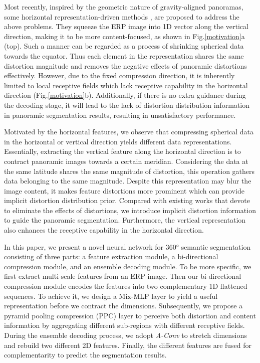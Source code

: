 \documentclass[runningheads]{llncs}
\begin{document}
	
	Most recently, inspired by the geometric nature of gravity-aligned panoramas, some horizontal representation-driven methods \cite{pintore2021slicenet}, \cite{sun2021hohonet} are proposed to address the above problems.
They squeeze the ERP image into 1D vector along the vertical direction, making it to be more content-focused, as shown in Fig.\ref{motivation}a (top).
Such a manner can be regarded as a process of shrinking spherical data towards the equator.
	Thus each element in the representation shares the same distortion magnitude and removes the negative effects of panoramic distortions effectively.
However, due to the fixed compression direction, it is inherently limited to local receptive fields which lack receptive capability in the horizontal direction (Fig.\ref{motivation}b).
	Additionally, if there is no extra guidance during the decoding stage, it will lead to the lack of distortion distribution information in panoramic segmentation results, resulting in unsatisfactory performance.
	
	
	Motivated by the horizontal features, we observe that compressing spherical data in the horizontal or vertical direction yields different data representations.
	Essentially, extracting the vertical feature along the horizontal direction is to contract panoramic images towards a certain meridian.
Considering the data at the same latitude shares the same magnitude of distortion, this operation gathers data belonging to the same magnitude.
	Despite this representation may blur the image content, it makes feature distortions more prominent which can provide implicit distortion distribution prior.
Compared with existing works that devote to eliminate the effects of distortions, we introduce implicit distortion information to guide the panoramic segmentation.
	Furthermore, the vertical representation also enhances the receptive capability in the horizontal direction. 
	
	
	In this paper, we present a novel neural network for 360° semantic segmentation consisting of three parts: a feature extraction module, a bi-directional compression module, and an ensemble decoding module.
	To be more specific, we first extract multi-scale features from an ERP image.
Then our bi-directional compression module encodes the features into two complementary 1D flattened sequences.
	To achieve it, we design a Mix-MLP layer to yield a useful representation before we contract the dimensions.
	Subsequently, we propose a pyramid pooling compression (PPC) layer to perceive both distortion and content information by aggregating different sub-regions with different receptive fields.
	During the ensemble decoding process, we adopt \emph{A-Conv} \cite{pintore2021slicenet} to stretch dimensions and rebuild two different 2D features.
	Finally, the different features are fused for complementarity to predict the segmentation results.
\end{document}
